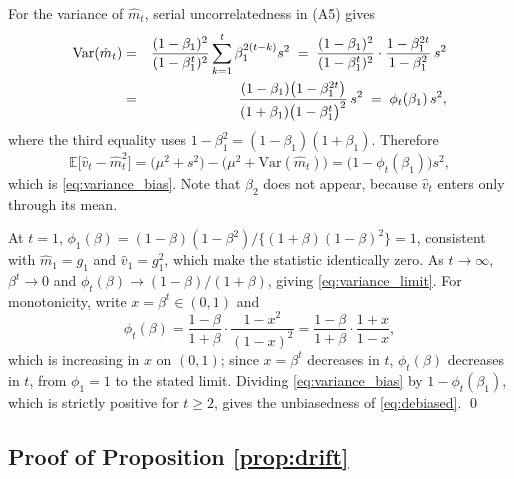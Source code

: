 \documentclass[pdflatex,sn-mathphys-num]{sn-jnl}%
\theoremstyle{thmstyleone}%
\theoremstyle{thmstyletwo}%
\theoremstyle{thmstylethree}%
\newenvironment{revblock}{\color{blue}}{}
\newcommand{\Var}{\mathrm{Var}}
\newcommand{\E}{\mathbb{E}}
\begin{document}
\begin{appendices}
For the variance of $\hat m_t$, serial uncorrelatedness in (A5) gives
\begin{eqnarray}
\Var(\hat m_t)
&=&
\frac{(1-\beta_1)^2}{(1-\beta_1^{t})^{2}}\sum_{k=1}^{t}\beta_1^{2(t-k)}s^2
\;=\;
\frac{(1-\beta_1)^2}{(1-\beta_1^{t})^{2}}\cdot\frac{1-\beta_1^{2t}}{1-\beta_1^{2}}\,s^2
\cr
&=&
\frac{(1-\beta_1)\bigl(1-\beta_1^{2t}\bigr)}{(1+\beta_1)\bigl(1-\beta_1^{t}\bigr)^{2}}\,s^2
\;=\;
\phi_t(\beta_1)\,s^2 ,
\end{eqnarray}
where the third equality uses $1-\beta_1^2=(1-\beta_1)(1+\beta_1)$. Therefore
\begin{equation}
\E\bigl[\hat v_t-\hat m^2_t\bigr]
=
\bigl(\mu^2+s^2\bigr)-\bigl(\mu^2+\Var(\hat m_t)\bigr)
=
\bigl(1-\phi_t(\beta_1)\bigr)s^2 ,
\end{equation}
which is \eqref{eq:variance_bias}. Note that $\beta_2$ does not appear, because $\hat v_t$ enters only through its mean.

At $t=1$, $\phi_1(\beta)=(1-\beta)(1-\beta^2)/\{(1+\beta)(1-\beta)^2\}=1$, consistent with $\hat m_1=g_1$ and $\hat v_1=g_1^2$, which make the statistic identically zero. As $t\to\infty$, $\beta^t\to0$ and $\phi_t(\beta)\to(1-\beta)/(1+\beta)$, giving \eqref{eq:variance_limit}. For monotonicity, write $x=\beta^{t}\in(0,1)$ and
\begin{equation}
\phi_t(\beta)=\frac{1-\beta}{1+\beta}\cdot\frac{1-x^{2}}{(1-x)^{2}}
=\frac{1-\beta}{1+\beta}\cdot\frac{1+x}{1-x},
\end{equation}
which is increasing in $x$ on $(0,1)$; since $x=\beta^{t}$ decreases in $t$, $\phi_t(\beta)$ decreases in $t$, from $\phi_1=1$ to the stated limit. Dividing \eqref{eq:variance_bias} by $1-\phi_t(\beta_1)$, which is strictly positive for $t\ge2$, gives the unbiasedness of \eqref{eq:debiased}. \qed

\begin{revblock}
\subsection*{Proof of Proposition \ref{prop:drift}}


\end{revblock}
\end{appendices}
\end{document}
